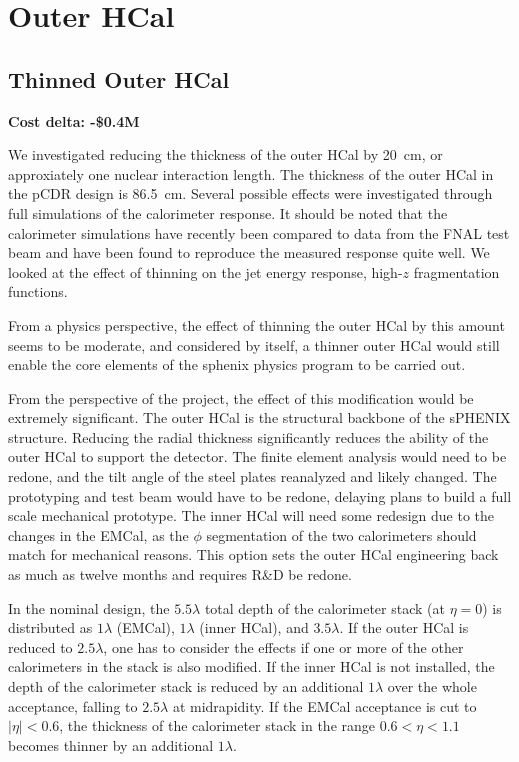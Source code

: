 \section{Outer HCal}
\subsection{Thinned Outer HCal}
\label{ohcal_thin}

\textbf{Cost delta: -\$0.4M}

We investigated reducing the thickness of the outer HCal by 20~cm, or
approxiately one nuclear interaction length.  The thickness of the
outer HCal in the pCDR design is 86.5~cm.  Several possible effects
were investigated through full \geant simulations of the calorimeter
response.  It should be noted that the calorimeter simulations have
recently been compared to data from the FNAL test beam and have been
found to reproduce the measured response quite well.  We looked at the
effect of thinning on the jet energy response, high-$z$ fragmentation
functions.

From a physics perspective, the effect of thinning the outer HCal by
this amount seems to be moderate, and considered by itself, a thinner
outer HCal would still enable the core elements of the sphenix physics
program to be carried out.

From the perspective of the project, the effect of this modification
would be extremely significant.  The outer HCal is the structural
backbone of the sPHENIX structure.  Reducing the radial thickness
significantly reduces the ability of the outer HCal to support the
detector.  The finite element analysis would need to be redone, and
the tilt angle of the steel plates reanalyzed and likely changed. The
prototyping and test beam would have to be redone, delaying plans to
build a full scale mechanical prototype.  The inner HCal will need
some redesign due to the changes in the EMCal, as the $\phi$
segmentation of the two calorimeters should match for mechanical
reasons.  This option sets the outer HCal engineering back as much as
twelve months and requires R\&D be redone.

In the nominal design, the $5.5 \lambda$ total depth of the
calorimeter stack (at $\eta = 0$) is distributed as $1 \lambda$
(EMCal), $1 \lambda$ (inner HCal), and $3.5 \lambda$.  If the outer
HCal is reduced to $2.5 \lambda$, one has to consider the effects if
one or more of the other calorimeters in the stack is also modified.
If the inner HCal is not installed, the depth of the calorimeter stack
is reduced by an additional $1 \lambda$ over the whole acceptance,
falling to $2.5 \lambda$ at midrapidity.  If the EMCal acceptance is
cut to $|\eta| < 0.6$, the thickness of the calorimeter stack in the
range $0.6 < \eta < 1.1$ becomes thinner by an additional $1 \lambda$.


